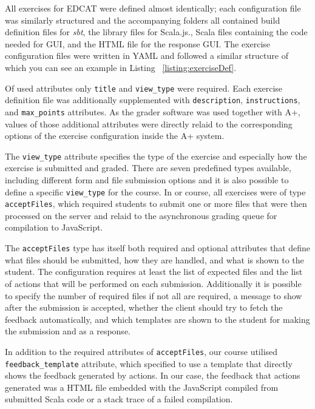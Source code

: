 All exercises for EDCAT were defined almost identically; each configuration file was similarly structured and the accompanying folders all contained build definition files for \emph{sbt}, the library files for Scala.js., Scala files containing the code needed for GUI, and the HTML file for the response GUI. The exercise configuration files were written in YAML and followed a similar structure of which you can see an example in Listing ~\ref{listing:exerciseDef}.

Of used attributes only \texttt{title} and \texttt{view\_type} were required. Each exercise definition file was additionally supplemented with \texttt{description}, \texttt{instructions}, and \texttt{max\_points} attributes. As the grader software was used together with A+, values of those additional attributes were directly relaid to the corresponding options of the exercise configuration inside the A+ system.

The \texttt{view\_type} attribute specifies the type of the exercise and especially how the exercise is submitted and graded. There are seven predefined types available, including different form and file submission options and it is also possible to define a specific \texttt{view\_type} for the course. In or course, all exercises were of type \texttt{acceptFiles}, which required students to submit one or more files that were then processed on the server and relaid to the asynchronous grading queue for compilation to JavaScript.

The \texttt{acceptFiles} type has itself both required and optional attributes that define what files should be submitted, how they are handled, and what is shown to the student. The configuration requires at least the list of expected files and the list of actions that will be performed on each submission. Additionally it is possible to specify the number of required files if not all are required, a message to show after the submission is accepted, whether the client should try to fetch the feedback automatically, and which templates are shown to the student for making the submission and as a response.

In addition to the required attributes of \texttt{acceptFiles}, our course utilised \texttt{feedback\_template} attribute, which specified to use a template that directly shows the feedback generated by actions. In our case, the feedback that actions generated was a HTML file embedded with the JavaScript compiled from submitted Scala code or a stack trace of a failed compilation.

